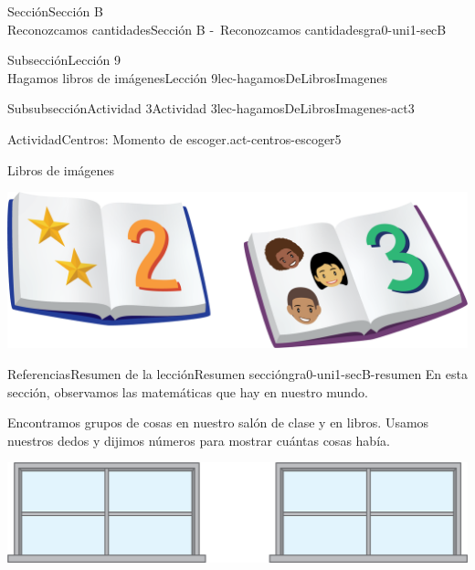 \begin{sectionptx}{Sección}{{\Large Sección B\\}Reconozcamos cantidades}{}{Sección B -~Reconozcamos cantidades}{}{}{gra0-uni1-secB}
\begin{subsectionptx}{Subsección}{{\normalsize Lección 9\\[-0.05cm]}Hagamos libros de imágenes}{}{Lección 9}{}{}{lec-hagamosDeLibrosImagenes}
\begin{subsubsectionptx}{Subsubsección}{Actividad 3}{}{Actividad 3}{}{}{lec-hagamosDeLibrosImagenes-act3}
\begin{activity}{Actividad}{Centros: Momento de escoger.}{act-centros-escoger5}
\begin{sidebyside}{2}{0.025}{0.025}{0.05}
\begin{sbspanel}{0.45}%
Libros de imágenes%
\par
\includegraphics[max width=\linewidth, center]{external/png-source/K.1.D Beta Student Workbooks.Books.png}
\end{sbspanel}%
\end{sidebyside}%
\end{activity}%
\end{subsubsectionptx}
\end{subsectionptx}
%
%
\typeout{************************************************}
\typeout{************************************************}
%
\begin{references-subsection}{Referencias}{Resumen de la lección}{}{Resumen sección}{}{}{gra0-uni1-secB-resumen}
En esta sección, observamos las matemáticas que hay en nuestro mundo.%
\par
Encontramos grupos de cosas en nuestro salón de clase y en libros.
 Usamos nuestros dedos y dijimos números para mostrar cuántas cosas había.%
\par
\begin{sidebyside}{2}{0.1}{0.1}{0.2}%
\begin{sbspanel}{0.5}%
\includegraphics[max width=\linewidth, center]{external/png-source/2-windows.png}
\end{sbspanel}%
\begin{sbspanel}{0.1}%

\end{sbspanel}
\end{sidebyside}
\end{references-subsection}
\end{sectionptx}
